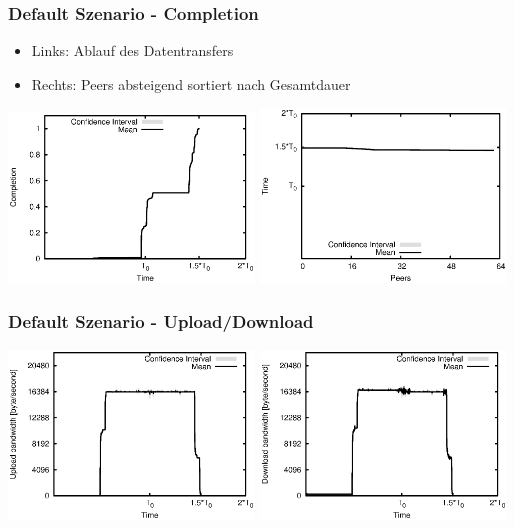 \begin{frame}
  \frametitle{Default Szenario - Completion}
  \begin{itemize}  
    \item Links: Ablauf des Datentransfers
    \item Rechts: Peers absteigend sortiert nach Gesamtdauer
  \end{itemize}

  \begin{center}
    \includegraphics[width=0.49\textwidth]{fig/plots/scenario_1_default/plots/GeneratedMeanChunkCompletion.csv.eps}
    \hfill
    \includegraphics[width=0.49\textwidth]{fig/plots/scenario_1_default/plots/GeneratedMeanSortedChunkCompletion.csv.eps}
  \end{center}
\end{frame}


\begin{frame}
  \frametitle{Default Szenario - Upload/Download}
  \begin{center}
    \includegraphics[width=0.49\textwidth]{fig/plots/scenario_1_default/plots/GeneratedMeanCurrentUploadBandwidth.csv.eps}
    \includegraphics[width=0.49\textwidth]{fig/plots/scenario_1_default/plots/GeneratedMeanCurrentDownloadBandwidth.csv.eps}
  \end{center}
\end{frame}


